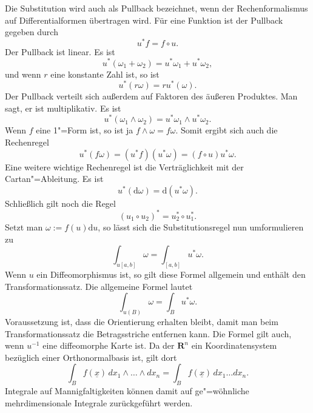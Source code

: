 \documentclass[a4paper,10pt,fleqn,twocolumn,twoside]{article}
\numberwithin{equation}{section}
\begin{document}
Die Substitution wird auch als Pullback bezeichnet, wenn der
Rechenformalismus auf Differentialformen übertragen wird. Für
eine Funktion ist der Pullback gegeben durch
\begin{equation}
u^{*}f = f\circ u.
\end{equation}
Der Pullback ist linear. Es ist
\begin{equation}
u^{*}(\omega_1+\omega_2)
= u^{*}\omega_1+u^{*}\omega_2,
\end{equation}
und wenn $r$ eine konstante Zahl ist, so ist
\begin{equation}
u^{*}(r\omega) = ru^{*}(\omega).
\end{equation}
Der Pullback verteilt sich außerdem auf Faktoren des
äußeren Produktes. Man sagt, er ist multiplikativ. Es ist
\begin{equation}
u^{*}(\omega_1\wedge\omega_2)
= u^{*}\omega_1\wedge u^{*}\omega_2.
\end{equation}
Wenn $f$ eine 1"=Form ist, so ist ja $f\wedge\omega = f\omega.$
Somit ergibt sich auch die Rechenregel
\begin{equation}
u^{*}(f\omega) = (u^{*}f)(u^{*}\omega)
= (f\circ u)u^{*}\omega.
\end{equation} 
Eine weitere wichtige Rechenregel ist die Verträglichkeit
mit der Cartan"=Ableitung. Es ist
\begin{equation}
u^{*}(\mathrm d\omega) = \mathrm d(u^{*}\omega).
\end{equation}
Schließlich gilt noch die Regel
\begin{equation}
(u_1\circ u_2)^{*} = u_2^{*}\circ u_1^{*}.
\end{equation}
Setzt man $\omega:=f(u)\mathrm du$, so lässt sich die
Substitutionsregel nun umformulieren zu
\begin{equation}
\int_{u[a,b]} \omega = \int_{[a,b]} u^{*}\omega.
\end{equation}
Wenn $u$ ein Diffeomorphismus ist, so gilt diese Formel
allgemein und enthält den Transformationssatz. Die allgemeine Formel
lautet
\begin{equation}
\int_{u(B)} \omega = \int_{B} u^{*}\omega.
\end{equation}
Voraussetzung ist, dass die Orientierung erhalten bleibt, damit man
beim Transformationssatz die Betragsstriche entfernen kann.
Die Formel gilt auch, wenn $u^{-1}$ eine diffeomorphe Karte ist.
Da der $\mathbf R^n$ ein Koordinatensystem bezüglich einer
Orthonormalbasis ist, gilt dort
\begin{equation}
\int_B f(\underline x)\, dx_1\wedge\ldots\wedge dx_n
= \int_B f(\underline x)\, dx_1\ldots dx_n.
\end{equation}
Integrale auf Mannigfaltigkeiten können damit auf ge"=wöhnliche
mehrdimensionale Integrale zurückgeführt werden.
\end{document}
